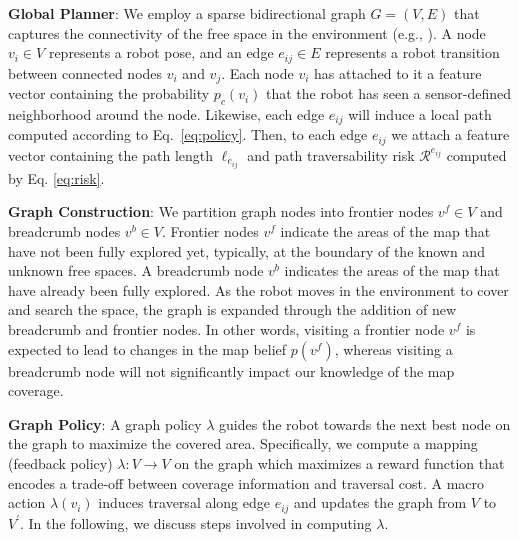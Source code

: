 \documentclass[letterpaper, 10pt, conference]{ieeeconf}      %
\newcommand{\ph}[1]{{\textbf{#1}:}} %
\newcommand{\rev}[1]{{\color{blue}#1}} %
\begin{document}
\ph{Global Planner} We employ a sparse bidirectional graph $G = (V, E)$ that captures the connectivity of the free space in the environment (e.g., \cite{Ali14-IJRR}). A node $v_i \in V$ represents a robot pose, and an edge $e_{ij} \in E$ represents a robot transition between connected nodes $v_i$ and $v_j$. Each node $v_i$ has attached to it a feature vector containing the probability $p_{c}(v_i)$ that the robot has seen a sensor-defined neighborhood around the node. Likewise, each edge $e_{ij}$ will induce a local path computed according to Eq.~\ref{eq:policy}. Then, to each edge $e_{ij}$ we attach a feature vector containing the path length $\ell_{e_{ij}}$ and path traversability risk $\mathcal{R}^{e_{ij}}$ computed by Eq. \ref{eq:risk}.


\ph{Graph Construction} 
We partition graph nodes into frontier nodes $v^f \in V$ and breadcrumb nodes $v^b \in V$. Frontier nodes $v^f$ indicate the areas of the map that have not been fully explored yet, typically, at the boundary of the known and unknown free spaces. A breadcrumb node $v^b$ indicates the areas of the map that have already been fully explored. As the robot moves in the environment to cover and search the space, the graph is expanded through the addition of new breadcrumb and frontier nodes. In other words, visiting a frontier node $v^f$ is expected to lead to changes in the map belief $p(v^f)$, whereas visiting a breadcrumb node will not significantly impact our knowledge of the map coverage.

\ph{Graph Policy}
A graph policy $\lambda$ guides the robot towards the next best node on the graph to maximize the covered area. Specifically, we compute a mapping (feedback policy) $\lambda:V\rightarrow V$ on the graph which maximizes a reward function that encodes a trade-off between coverage information and traversal cost. A macro action $\lambda(v_i)$ induces traversal along edge $e_{ij}$ and updates the graph from $V$ to $V^\prime$. In the following, we discuss steps involved in computing $\lambda$.
\end{document}
